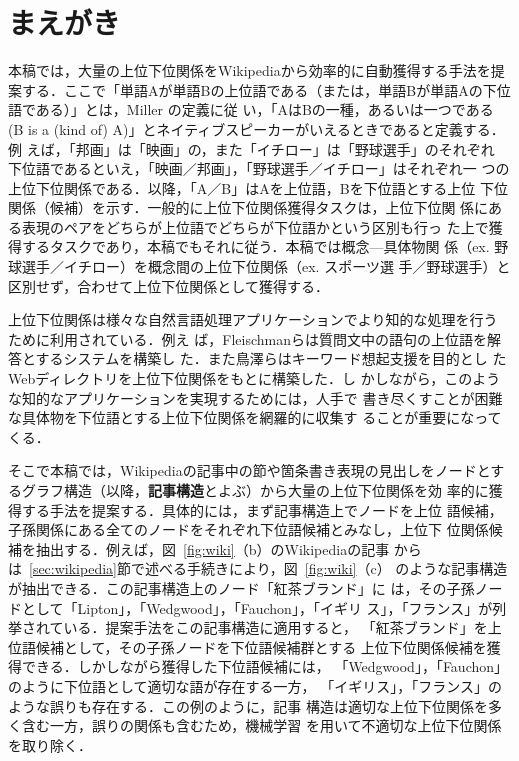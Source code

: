 \documentclass[japanese]{jnlp_1.4}
\begin{document}
\maketitle

\section{まえがき}
本稿では，大量の上位下位関係をWikipediaから効率的に自動獲得する手法を提
案する．ここで「単語Aが単語Bの上位語である（または，単語Bが単語Aの下位
語である）」とは，Miller の定義\cite{wordnet-book_1998}に従
い，「AはBの一種，あるいは一つである (B is a (kind
of) A)」とネイティブスピーカーがいえるときであると定義する．例
  えば，「邦画」は「映画」の，また「イチロー」は「野球選手」のそれぞれ
  下位語であるといえ，「映画／邦画」，「野球選手／イチロー」はそれぞれ一
  つの上位下位関係である．以降，「A／B」はAを上位語，Bを下位語とする上位
  下位関係（候補）を示す．一般的に上位下位関係獲得タスクは，上位下位関
  係にある表現のペアをどちらが上位語でどちらが下位語かという区別も行っ
  た上で獲得するタスクであり，本稿でもそれに従う．本稿では概念—具体物関
  係（ex. 野球選手／イチロー）を概念間の上位下位関係（ex. スポーツ選
  手／野球選手）と区別せず，合わせて上位下位関係として獲得する．

上位下位関係は様々な自然言語処理アプリケーションでより知的な処理を行う
ために利用されている\cite{Fleischman_2003,Torisawa_2008}．例え
ば，Fleischmanらは質問文中の語句の上位語を解答とするシステムを構築し
た\cite{Fleischman_2003}．また鳥澤らはキーワード想起支援を目的とし
たWebディレクトリを上位下位関係をもとに構築した\cite{Torisawa_2008}．し
かしながら，このような知的なアプリケーションを実現するためには，人手で
書き尽くすことが困難な具体物を下位語とする上位下位関係を網羅的に収集す
ることが重要になってくる．

そこで本稿では，Wikipediaの記事中の節や箇条書き表現の見出しをノードとす
るグラフ構造（以降，\textbf{記事構造}とよぶ）から大量の上位下位関係を効
率的に獲得する手法を提案する．具体的には，まず記事構造上でノードを上位
語候補，子孫関係にある全てのノードをそれぞれ下位語候補とみなし，上位下
位関係候補{を}抽出する．例えば，図~\ref{fig:wiki}（b）のWikipediaの記事
からは~\ref{sec:wikipedia}節で述べる手続きにより，図~\ref{fig:wiki}（c）
のような記事構造が抽出できる．この記事構造上のノード「紅茶ブランド」に
は，その子孫ノードとして「Lipton」，「Wedgwood」，「Fauchon」，「イギリ
ス」，「フランス」が列挙されている．提案手法をこの記事構造に適用すると，
「紅茶ブランド」を上位語候補として，その子孫ノードを下位語候補群とする
上位下位関係候補を獲得できる．しかしながら獲得した下位語候補には，
「Wedgwood」，「Fauchon」のように下位語として適切な語が存在する一方，
「イギリス」，「フランス」のような誤りも存在する．この例のように，記事
構造は適切な上位下位関係を多く含む一方，誤りの関係も含むため，機械学習
を用いて不適切な上位下位関係を取り除く．
\end{document}

